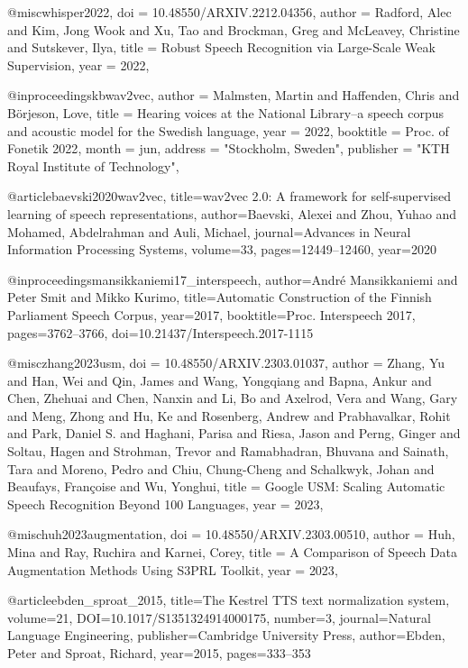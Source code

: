 @misc{whisper2022,
  doi = {10.48550/ARXIV.2212.04356},
  author = {Radford, Alec and Kim, Jong Wook and Xu, Tao and Brockman, Greg and McLeavey, Christine and Sutskever, Ilya},
  title = {{Robust Speech Recognition via Large-Scale Weak Supervision}},
  year = {2022},
}

@inproceedings{kbwav2vec,
author = {Malmsten, Martin and Haffenden, Chris and Börjeson, Love},
title = {{Hearing voices at the National Library--a speech corpus and acoustic model for the Swedish language}},
year = {2022},
booktitle = {Proc. of Fonetik 2022},
    month = jun,
    address = "Stockholm, Sweden",
    publisher = "KTH Royal Institute of Technology",
}

@article{baevski2020wav2vec,
  title={wav2vec 2.0: A framework for self-supervised learning of speech representations},
  author={Baevski, Alexei and Zhou, Yuhao and Mohamed, Abdelrahman and Auli, Michael},
  journal={Advances in Neural Information Processing Systems},
  volume={33},
  pages={12449--12460},
  year={2020}
}

@inproceedings{mansikkaniemi17_interspeech,
  author={André Mansikkaniemi and Peter Smit and Mikko Kurimo},
  title={{Automatic Construction of the Finnish Parliament Speech Corpus}},
  year=2017,
  booktitle={Proc. Interspeech 2017},
  pages={3762--3766},
  doi={10.21437/Interspeech.2017-1115}
}

@misc{zhang2023usm,
  doi = {10.48550/ARXIV.2303.01037},
  author = {Zhang, Yu and Han, Wei and Qin, James and Wang, Yongqiang and Bapna, Ankur and Chen, Zhehuai and Chen, Nanxin and Li, Bo and Axelrod, Vera and Wang, Gary and Meng, Zhong and Hu, Ke and Rosenberg, Andrew and Prabhavalkar, Rohit and Park, Daniel S. and Haghani, Parisa and Riesa, Jason and Perng, Ginger and Soltau, Hagen and Strohman, Trevor and Ramabhadran, Bhuvana and Sainath, Tara and Moreno, Pedro and Chiu, Chung-Cheng and Schalkwyk, Johan and Beaufays, Françoise and Wu, Yonghui},
  title = {{Google USM: Scaling Automatic Speech Recognition Beyond 100 Languages}},
  year = {2023},
}

@misc{huh2023augmentation,
  doi = {10.48550/ARXIV.2303.00510},
  author = {Huh, Mina and Ray, Ruchira and Karnei, Corey},
  title = {{A Comparison of Speech Data Augmentation Methods Using S3PRL Toolkit}},
  year = {2023},
}

@article{ebden_sproat_2015,
    title={{The Kestrel TTS text normalization system}},
    volume={21},
    DOI={10.1017/S1351324914000175},
    number={3},
    journal={Natural Language Engineering},
    publisher={Cambridge University Press},
    author={Ebden, Peter and Sproat, Richard},
    year={2015},
    pages={333–353}
}

